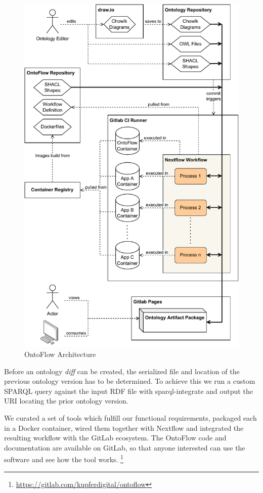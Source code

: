 \documentclass[runningheads]{llncs}
\begin{document}
\begin{figure}[htbp]
	\centering
	\includegraphics[width=.75\textwidth]{architecture.pdf}
	\caption{OntoFlow Architecture}
	\label{fig:architecture}
\end{figure}
Before an ontology \textit{diff} can be created, the serialized file and location of the previous ontology version has to be determined. To achieve this we run a custom SPARQL query against the input RDF file with sparql-integrate and output the URI locating the prior ontology version.

We curated a set of tools which fulfill our functional requirements, packaged each in a Docker container, wired them together with Nextflow and integrated the resulting workflow with the GitLab ecosystem.
The OntoFlow code and documentation are available on GitLab, so that anyone interested can use the software and see how the tool works. \footnote{\url{https://gitlab.com/kupferdigital/ontoflow}}
\end{document}
